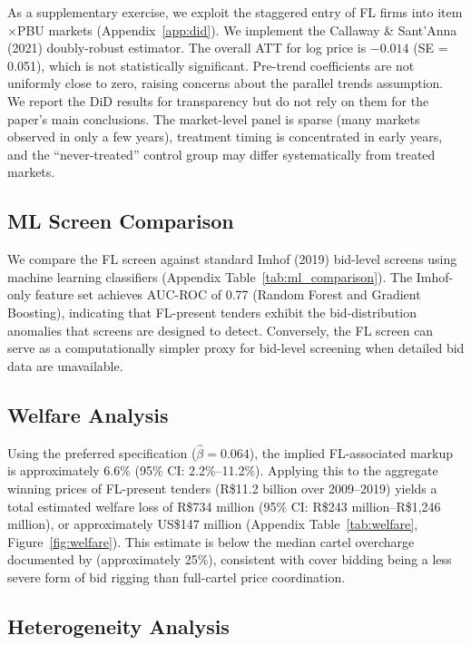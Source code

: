 As a supplementary exercise, we exploit the staggered entry of FL firms into item$\times$PBU markets (Appendix~\ref{app:did}). We implement the Callaway \& Sant'Anna (2021) doubly-robust estimator. The overall ATT for log price is $-0.014$ (SE = 0.051), which is not statistically significant. Pre-trend coefficients are not uniformly close to zero, raising concerns about the parallel trends assumption. We report the DiD results for transparency but do not rely on them for the paper's main conclusions. The market-level panel is sparse (many markets observed in only a few years), treatment timing is concentrated in early years, and the ``never-treated'' control group may differ systematically from treated markets.

\subsection{ML Screen Comparison}

We compare the FL screen against standard Imhof (2019) bid-level screens using machine learning classifiers (Appendix Table~\ref{tab:ml_comparison}). The Imhof-only feature set achieves AUC-ROC of 0.77 (Random Forest and Gradient Boosting), indicating that FL-present tenders exhibit the bid-distribution anomalies that screens are designed to detect. Conversely, the FL screen can serve as a computationally simpler proxy for bid-level screening when detailed bid data are unavailable.

\subsection{Welfare Analysis}

Using the preferred specification ($\hat{\beta} = 0.064$), the implied FL-associated markup is approximately 6.6\% (95\% CI: 2.2\%--11.2\%). Applying this to the aggregate winning prices of FL-present tenders (R\$11.2 billion over 2009--2019) yields a total estimated welfare loss of R\$734 million (95\% CI: R\$243 million--R\$1,246 million), or approximately US\$147 million (Appendix Table~\ref{tab:welfare}, Figure~\ref{fig:welfare}). This estimate is below the median cartel overcharge documented by \citet{connor2007price} (approximately 25\%), consistent with cover bidding being a less severe form of bid rigging than full-cartel price coordination.

\subsection{Heterogeneity Analysis}

